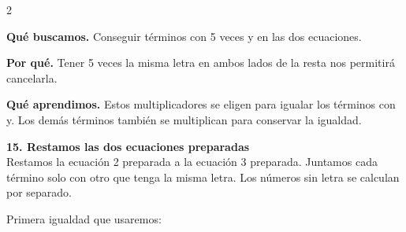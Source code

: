 \documentclass[11pt,a4paper,landscape]{article}
\begin{document}
\begin{multicols*}{2}
\begin{minipage}{\linewidth}
\par\smallskip\textbf{Qué buscamos.} Conseguir términos con 5 veces y en las dos ecuaciones.
\par\smallskip\textbf{Por qué.} Tener 5 veces la misma letra en ambos lados de la resta nos permitirá cancelarla.
\par{}\par\smallskip
\par\smallskip\textbf{Qué aprendimos.} Estos multiplicadores se eligen para igualar los términos con y. Los demás términos también se multiplican para conservar la igualdad.
\end{minipage}\par\medskip
\noindent\begin{minipage}{\linewidth}\textbf{15. Restamos las dos ecuaciones preparadas}\\[2pt]Restamos la ecuación 2 preparada a la ecuación 3 preparada. Juntamos cada término solo con otro que tenga la misma letra. Los números sin letra se calculan por separado.
\par{}\par\smallskip
\par\smallskip Primera igualdad que usaremos:

\end{minipage}
\end{multicols*}
\end{document}
